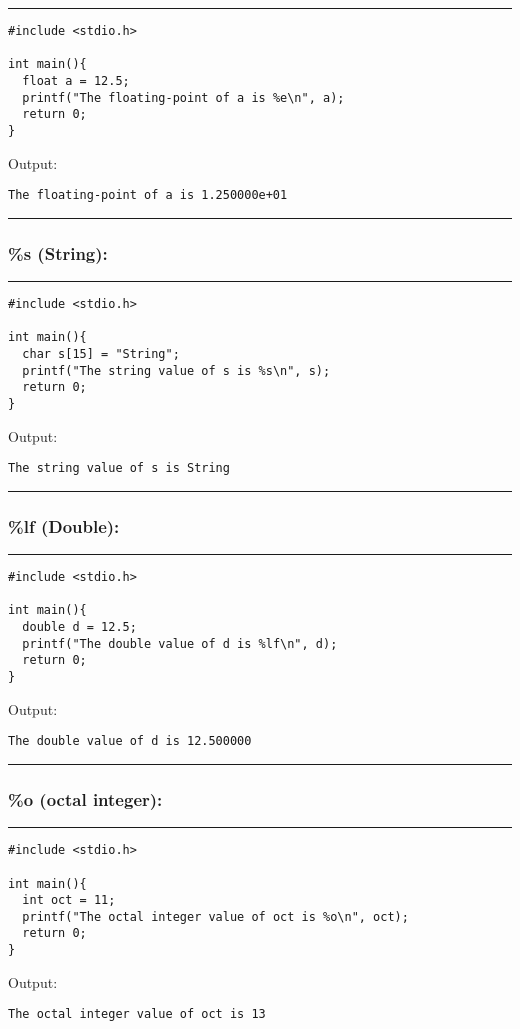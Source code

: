 \documentclass[a4paper]{article}
\begin{document}
\noindent\rule{\textwidth}{0.5pt}
\begin{verbatim}
#include <stdio.h>

int main(){
  float a = 12.5;
  printf("The floating-point of a is %e\n", a);
  return 0;
}
\end{verbatim}
Output:
\begin{verbatim}
The floating-point of a is 1.250000e+01
\end{verbatim}

\noindent\rule{\textwidth}{0.5pt}

\subsubsection{\%s (String):}
\label{sec:org2bb8353}

\noindent\rule{\textwidth}{0.5pt}
\begin{verbatim}
#include <stdio.h>

int main(){
  char s[15] = "String";
  printf("The string value of s is %s\n", s);
  return 0;
}
\end{verbatim}
Output:
\begin{verbatim}
The string value of s is String
\end{verbatim}

\noindent\rule{\textwidth}{0.5pt}

\subsubsection{\%lf (Double):}
\label{sec:org38fb082}

\noindent\rule{\textwidth}{0.5pt}
\begin{verbatim}
#include <stdio.h>

int main(){
  double d = 12.5;
  printf("The double value of d is %lf\n", d);
  return 0;
}
\end{verbatim}
Output:
\begin{verbatim}
The double value of d is 12.500000
\end{verbatim}

\noindent\rule{\textwidth}{0.5pt}

\subsubsection{\%o (octal integer):}
\label{sec:org9d62052}
\noindent\rule{\textwidth}{0.5pt}
\begin{verbatim}
#include <stdio.h>

int main(){
  int oct = 11;
  printf("The octal integer value of oct is %o\n", oct);
  return 0;
}
\end{verbatim}
Output:
\begin{verbatim}
The octal integer value of oct is 13
\end{verbatim}
\end{document}
